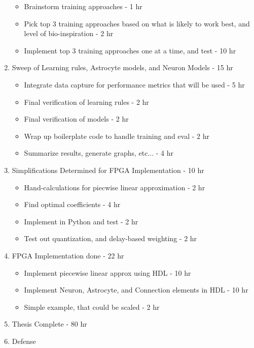 \begin{enumerate}
\begin{itemize}
            \item Brainstorm training approaches - 1 hr
            \item Pick top 3 training approaches based on what is likely to work best, and level of bio-inspiration - 2 hr
            \item Implement top 3 training approaches one at a time, and test - 10 hr
        \end{itemize}
    \item \label{task:sweep} Sweep of Learning rules, Astrocyte models, and Neuron Models - 15 hr
        \begin{itemize}
            \item Integrate data capture for performance metrics that will be used - 5 hr
            \item Final verification of learning rules - 2 hr
            \item Final verification of models - 2 hr
            \item Wrap up boilerplate code to handle training and eval - 2 hr
            \item Summarize results, generate graphs, etc... - 4 hr
        \end{itemize}
    \item \label{task:simplify} Simplifications Determined for FPGA Implementation - 10 hr
        \begin{itemize}
            \item Hand-calculations for piecwise linear approximation - 2 hr
            \item Find optimal coefficients - 4 hr
            \item Implement in Python and test - 2 hr
            \item Test out quantization, and delay-based weighting - 2 hr
        \end{itemize}
    \item \label{task:fpga} FPGA Implementation done - 22 hr
        \begin{itemize}
            \item Implement piecewise linear approx using HDL - 10 hr
            \item Implement Neuron, Astrocyte, and Connection elements in HDL - 10 hr
            \item Simple example, that could be scaled - 2 hr
        \end{itemize}
    \item \label{task:writing} Thesis Complete - 80 hr
    \item Defense
\end{enumerate}

